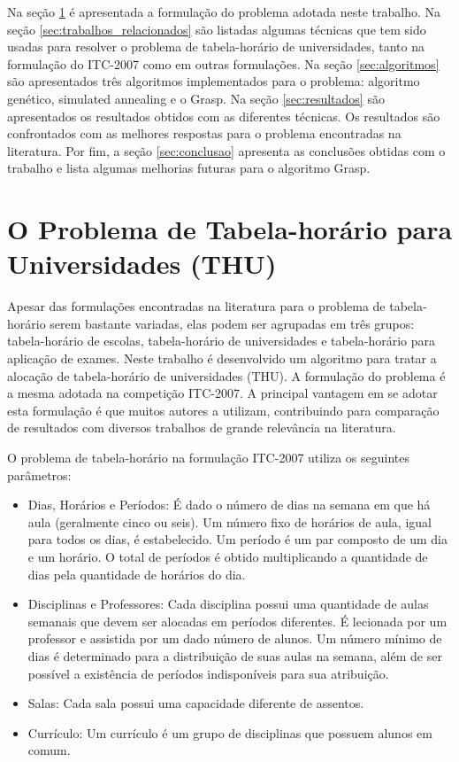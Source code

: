 \documentclass[11pt]{article}
\begin{document}
Na seção \ref{sec:problema} é apresentada a formulação do problema adotada neste trabalho. Na seção \ref{sec:trabalhos_relacionados} são listadas algumas técnicas que tem sido usadas para resolver o problema de tabela-horário de universidades, tanto na formulação do ITC-2007 como em outras formulações. Na seção \ref{sec:algoritmos} são apresentados três algoritmos implementados para o problema: algoritmo genético, simulated annealing e o Grasp. Na seção \ref{sec:resultados} são apresentados os resultados obtidos com as diferentes técnicas. Os resultados são confrontados com as melhores respostas para o problema encontradas na literatura. Por fim, a seção \ref{sec:conclusao} apresenta as conclusões obtidas com o trabalho e lista algumas melhorias futuras para o algoritmo Grasp.

\section{O Problema de Tabela-horário para Universidades (THU)}
\label{sec:problema}

Apesar das formulações encontradas na literatura para o problema de tabela-horário serem bastante variadas, elas podem ser agrupadas em três grupos: tabela-horário de escolas, tabela-horário de universidades e tabela-horário para aplicação de exames. Neste trabalho é desenvolvido um algoritmo para tratar a alocação de tabela-horário de universidades (THU). A formulação do problema é a mesma adotada na competição ITC-2007. A principal vantagem em se adotar esta formulação é que muitos autores a utilizam, contribuindo para comparação de resultados com diversos trabalhos de grande relevância na literatura.

O problema de tabela-horário na formulação ITC-2007 utiliza os seguintes parâmetros:

\begin{itemize}

\item Dias, Horários e Períodos: É dado o número de dias na semana em que há aula (geralmente cinco ou seis). Um número fixo de horários de aula, igual para todos os dias, é estabelecido. Um período é um par composto de um dia e um horário. O total de períodos é obtido multiplicando a quantidade de dias pela quantidade de horários do dia.

\item Disciplinas e Professores: Cada disciplina possui uma quantidade de aulas semanais que devem ser alocadas em períodos diferentes. É lecionada por um professor e assistida por um dado número de alunos. Um número mínimo de dias é determinado para a distribuição de suas aulas na semana, além de ser possível a existência de períodos indisponíveis para sua atribuição.

\item Salas: Cada sala possui uma capacidade diferente de assentos.

\item Currículo: Um currículo é um grupo de disciplinas que possuem alunos em comum.

\end{itemize}
\end{document}

